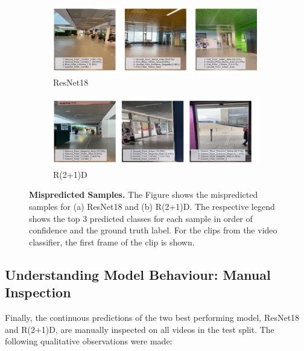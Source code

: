 \documentclass[a4paper]{article}
\begin{document}
\begin{figure}
\centering

\begin{subfigure}[b]{\textwidth}
\centering
\includegraphics[width=\textwidth]{./figures/resnet18-mispredicted-frames.png}
\caption{ResNet18}
\end{subfigure}

\begin{subfigure}[b]{\textwidth}
\centering
\includegraphics[width=\textwidth]{./figures/r2plus1d-mispredicted-frames.png}
\caption{R(2+1)D}
\end{subfigure}

\caption{\textbf{Mispredicted Samples.} The Figure shows the mispredicted
samples for (a) ResNet18 and (b) R(2+1)D. The respective legend shows the
top 3 predicted classes for each sample in order of confidence and the
ground truth label. For the clips from the video classifier, the first
frame of the clip is shown.}
\label{fig:mispredicted}
\end{figure}


\subsection{Understanding Model Behaviour: Manual Inspection} %
\label{sub:manual}

Finally, the continuous predictions of the two best performing model, ResNet18
and R(2+1)D, are manually inspected on all videos in the test split. The
following qualitative observations were made:
\end{document}
